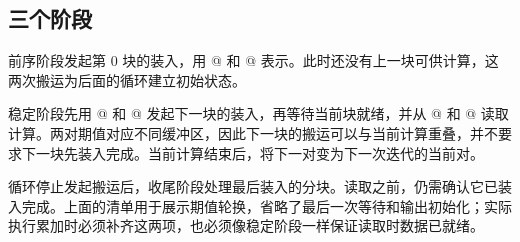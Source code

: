 \subsection*{三个阶段}

前序阶段发起第 0 块的装入，用 @ 和 @ 表示。此时还没有上一块可供计算，这两次搬运为后面的循环建立初始状态。

稳定阶段先用 @ 和 @ 发起下一块的装入，再等待当前块就绪，并从 @ 和 @ 读取计算。两对期值对应不同缓冲区，因此下一块的搬运可以与当前计算重叠，并不要求下一块先装入完成。当前计算结束后，\co@swap@ 将下一对变为下一次迭代的当前对。

循环停止发起搬运后，收尾阶段处理最后装入的分块。读取之前，仍需确认它已装入完成。上面的清单用于展示期值轮换，省略了最后一次等待和输出初始化；实际执行累加时必须补齐这两项，也必须像稳定阶段一样保证读取时数据已就绪。
